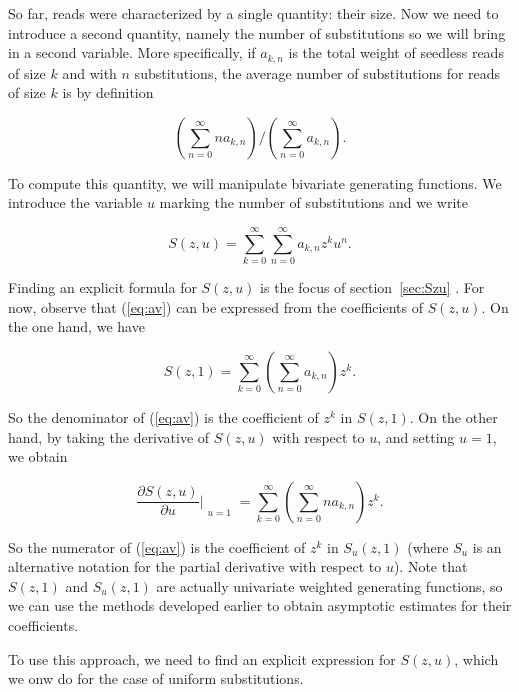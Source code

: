 \documentclass{article}
\begin{document}
So far, reads were characterized by a single quantity: their size. Now we
need to introduce a second quantity, namely the number of substitutions so
we will bring in a second variable. More specifically, if $a_{k,n}$ is the
total weight of seedless reads of size $k$ and with $n$ substitutions, the
average number of substitutions for reads of size $k$ is by definition


\begin{equation}
\label{eq:av}
\left( \sum_{n=0}^\infty na_{k,n} \right) \Big/
 \left( \sum_{n=0}^\infty a_{k,n} \right).
\end{equation}

To compute this quantity, we will manipulate bivariate generating
functions. We introduce the variable $u$ marking the number of
substitutions and we write

\begin{equation*}
S(z,u) = \sum_{k=0}^\infty\sum_{n=0}^\infty a_{k,n}z^ku^n.
\end{equation*}

Finding an explicit formula for $S(z,u)$ is the focus of
section~\ref{sec:Szu} .  For now, observe that (\ref{eq:av}) can be
expressed from the coefficients of $S(z,u)$. On the one hand, we have

\begin{equation*}
S(z,1) = \sum_{k=0}^\infty \left( \sum_{n=0}^\infty a_{k,n} \right) z^k.
\end{equation*}

So the denominator of (\ref{eq:av}) is the coefficient of $z^k$ in
$S(z,1)$. On the other hand, by taking the derivative of $S(z,u)$ with
respect to $u$, and setting $u=1$, we obtain

\begin{equation*}
\frac{\partial S(z,u)}{\partial u} \Bigr|_{\substack{\\u=1}} =
\sum_{k=0}^\infty \left( \sum_{n=0}^\infty na_{k,n} \right) z^k.
\end{equation*}

So the numerator of (\ref{eq:av}) is the coefficient of $z^k$ in
$S_u(z,1)$ (where $S_u$ is an alternative notation for the partial
derivative with respect to $u$). Note that $S(z,1)$ and $S_u(z,1)$ are
actually univariate weighted generating functions, so we can use the
methods developed earlier to obtain asymptotic estimates for their
coefficients.

To use this approach, we need to find an explicit expression for $S(z,u)$,
which we onw do for the case of uniform substitutions.
\end{document}
